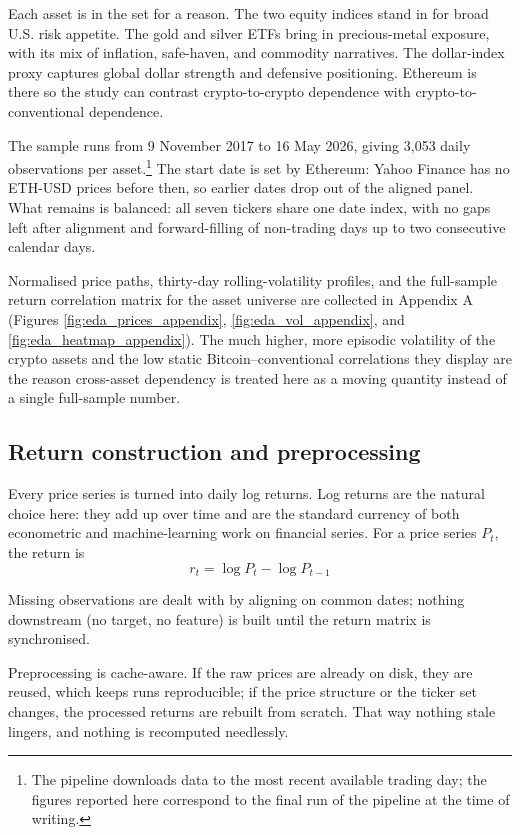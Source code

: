 Each asset is in the set for a reason. The two equity indices stand in for broad U.S. risk appetite. The gold and silver ETFs bring in precious-metal exposure, with its mix of inflation, safe-haven, and commodity narratives. The dollar-index proxy captures global dollar strength and defensive positioning. Ethereum is there so the study can contrast crypto-to-crypto dependence with crypto-to-conventional dependence.

The sample runs from 9 November 2017 to 16 May 2026, giving 3{,}053 daily observations per asset.\footnote{The pipeline downloads data to the most recent available trading day; the figures reported here correspond to the final run of the pipeline at the time of writing.} The start date is set by Ethereum: Yahoo Finance has no ETH-USD prices before then, so earlier dates drop out of the aligned panel. What remains is balanced: all seven tickers share one date index, with no gaps left after alignment and forward-filling of non-trading days up to two consecutive calendar days.

Normalised price paths, thirty-day rolling-volatility profiles, and the full-sample return correlation matrix for the asset universe are collected in Appendix A (Figures \ref{fig:eda_prices_appendix}, \ref{fig:eda_vol_appendix}, and \ref{fig:eda_heatmap_appendix}). The much higher, more episodic volatility of the crypto assets and the low static Bitcoin--conventional correlations they display are the reason cross-asset dependency is treated here as a moving quantity instead of a single full-sample number.

\subsection{Return construction and preprocessing}

Every price series is turned into daily log returns. Log returns are the natural choice here: they add up over time and are the standard currency of both econometric and machine-learning work on financial series. For a price series $P_t$, the return is
\[
    r_t = \log P_t - \log P_{t-1}
\]


Missing observations are dealt with by aligning on common dates; nothing downstream (no target, no feature) is built until the return matrix is synchronised.

Preprocessing is cache-aware. If the raw prices are already on disk, they are reused, which keeps runs reproducible; if the price structure or the ticker set changes, the processed returns are rebuilt from scratch. That way nothing stale lingers, and nothing is recomputed needlessly.

